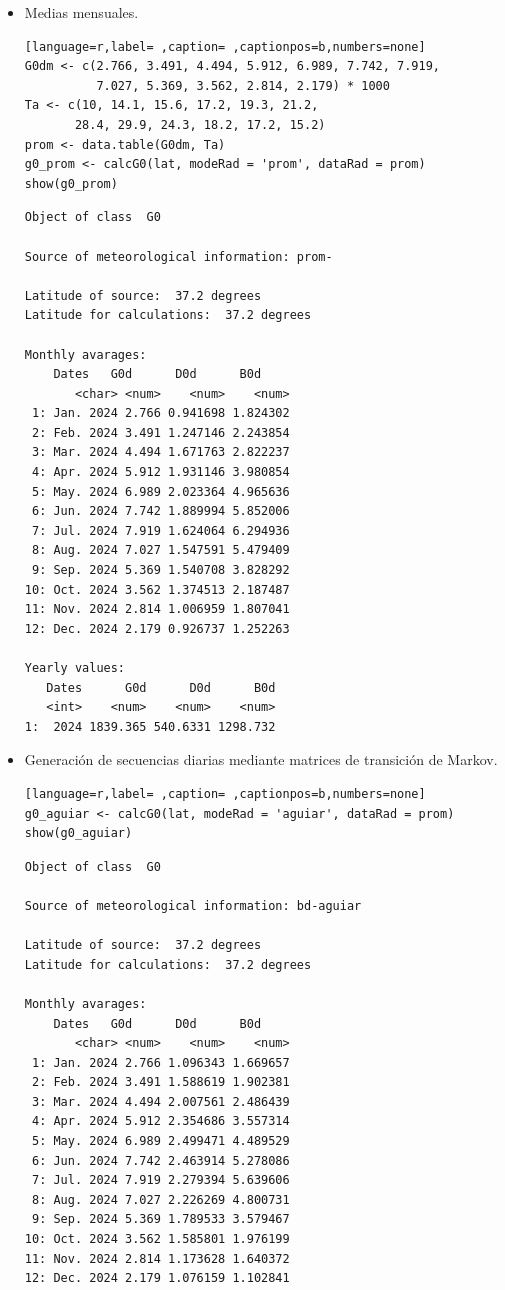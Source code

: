 \begin{itemize}
\item Medias mensuales.
\begin{lstlisting}[language=r,label= ,caption= ,captionpos=b,numbers=none]
G0dm <- c(2.766, 3.491, 4.494, 5.912, 6.989, 7.742, 7.919,
          7.027, 5.369, 3.562, 2.814, 2.179) * 1000
Ta <- c(10, 14.1, 15.6, 17.2, 19.3, 21.2,
       28.4, 29.9, 24.3, 18.2, 17.2, 15.2)
prom <- data.table(G0dm, Ta) 
g0_prom <- calcG0(lat, modeRad = 'prom', dataRad = prom)
show(g0_prom)
\end{lstlisting}

\begin{verbatim}
Object of class  G0 

Source of meteorological information: prom- 

Latitude of source:  37.2 degrees
Latitude for calculations:  37.2 degrees

Monthly avarages:
	Dates   G0d      D0d      B0d
       <char> <num>    <num>    <num>
 1: Jan. 2024 2.766 0.941698 1.824302
 2: Feb. 2024 3.491 1.247146 2.243854
 3: Mar. 2024 4.494 1.671763 2.822237
 4: Apr. 2024 5.912 1.931146 3.980854
 5: May. 2024 6.989 2.023364 4.965636
 6: Jun. 2024 7.742 1.889994 5.852006
 7: Jul. 2024 7.919 1.624064 6.294936
 8: Aug. 2024 7.027 1.547591 5.479409
 9: Sep. 2024 5.369 1.540708 3.828292
10: Oct. 2024 3.562 1.374513 2.187487
11: Nov. 2024 2.814 1.006959 1.807041
12: Dec. 2024 2.179 0.926737 1.252263

Yearly values:
   Dates      G0d      D0d      B0d
   <int>    <num>    <num>    <num>
1:  2024 1839.365 540.6331 1298.732
\end{verbatim}

\item Generación de secuencias diarias mediante matrices de transición de Markov.
\begin{lstlisting}[language=r,label= ,caption= ,captionpos=b,numbers=none]
g0_aguiar <- calcG0(lat, modeRad = 'aguiar', dataRad = prom)
show(g0_aguiar)
\end{lstlisting}

\begin{verbatim}
Object of class  G0 

Source of meteorological information: bd-aguiar 

Latitude of source:  37.2 degrees
Latitude for calculations:  37.2 degrees

Monthly avarages:
	Dates   G0d      D0d      B0d
       <char> <num>    <num>    <num>
 1: Jan. 2024 2.766 1.096343 1.669657
 2: Feb. 2024 3.491 1.588619 1.902381
 3: Mar. 2024 4.494 2.007561 2.486439
 4: Apr. 2024 5.912 2.354686 3.557314
 5: May. 2024 6.989 2.499471 4.489529
 6: Jun. 2024 7.742 2.463914 5.278086
 7: Jul. 2024 7.919 2.279394 5.639606
 8: Aug. 2024 7.027 2.226269 4.800731
 9: Sep. 2024 5.369 1.789533 3.579467
10: Oct. 2024 3.562 1.585801 1.976199
11: Nov. 2024 2.814 1.173628 1.640372
12: Dec. 2024 2.179 1.076159 1.102841


\end{verbatim}
\end{itemize}
